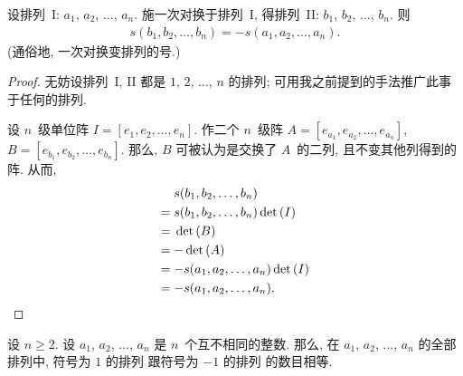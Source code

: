 \begin{theorem}
    设排列~I: \(a_1\), \(a_2\), \(\dots\), \(a_n\).
    施一次对换于排列~I,
    得排列~II: \(b_1\), \(b_2\), \(\dots\), \(b_n\).
    则
    \begin{align*}
        s(b_1, b_2, \dots, b_n) = -s(a_1, a_2, \dots, a_n).
    \end{align*}
    (通俗地, 一次对换变排列的号.)
\end{theorem}

\begin{proof}
    无妨设排列~I, II 都是
    \(1\), \(2\), \(\dots\), \(n\) 的排列;
    可用我之前提到的手法推广此事于任何的排列.

    设 \(n\)~级单位阵
    \(I = [e_1, e_2, \dots, e_n]\).
    作二个 \(n\)~级阵
    \(A = [e_{a_1}, e_{a_2}, \dots, e_{a_n}]\),
    \(B = [e_{b_1}, e_{b_2}, \dots, e_{b_n}]\).
    那么, \(B\) 可被认为是交换了 \(A\)~的二列,
    且不变其他列得到的阵.
    从而,
    \begin{align*}
             & s(b_1, b_2, \dots, b_n)
        \\
        = {} & s(b_1, b_2, \dots, b_n) \det {(I)}
        \\
        = {} & \det {(B)}
        \\
        = {} & {-\det {(A)}}
        \\
        = {} & {-s(a_1, a_2, \dots, a_n)} \det {(I)}
        \\
        = {} & {-s(a_1, a_2, \dots, a_n)}.
        \qedhere
    \end{align*}
\end{proof}

\begin{theorem}
    设 \(n \geq 2\).
    设 \(a_1\), \(a_2\), \(\dots\), \(a_n\) 是
    \(n\)~个互不相同的整数.
    那么, 在
    \(a_1\), \(a_2\), \(\dots\), \(a_n\) 的全部排列中,
    符号为 \(1\) 的排列%
    跟符号为 \(-1\) 的排列%
    的数目相等.
\end{theorem}

